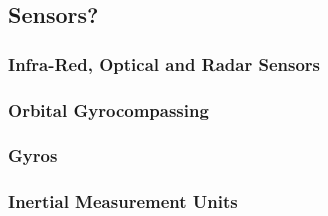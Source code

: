 \subsection{Sensors?}
\subsubsection{Infra-Red, Optical and Radar Sensors}
\subsubsection{Orbital Gyrocompassing}
\subsubsection{Gyros}
\subsubsection{Inertial Measurement Units}